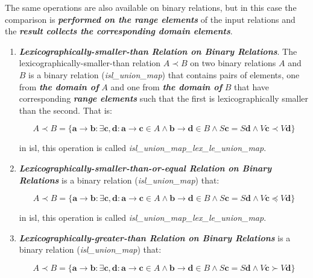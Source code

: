 The same operations are also available on binary relations, but in this case the comparison is \textbf{\textit{performed on the range elements}} of the input relations and the \textbf{\textit{result collects the corresponding domain elements}}.

\begin{enumerate}
  \item \textcolor{vr}{\textbf{\emph{Lexicographically-smaller-than Relation on Binary Relations}}}. The lexicographically-smaller-than relation $A \prec B$ on two binary relations $A$ and $B$ is a binary relation (\textcolor{pg}{\emph{isl\_union\_map}}) that contains pairs of elements, one from \textbf{\textit{the domain of}} $A$ and one from \textbf{\textit{the domain of}} $B$ that have corresponding \textbf{\textit{range elements}} such that the first is lexicographically smaller than the second. That is:

  $$A \prec B = \{
  \mathbf{a} \rightarrow \mathbf{b}: \exists \mathbf{c},\mathbf{d}:
  \mathbf{a} \rightarrow \mathbf{c} \in A \wedge \mathbf{b} \rightarrow \mathbf{d} \in B
  \wedge \mathit{S}\mathbf{c} = \mathit{S}\mathbf{d}
  \wedge \mathit{V}\mathbf{c} \prec \mathit{V}\mathbf{d}
  \}$$

  in isl, this operation is called \textcolor{pg}{\emph{isl\_union\_map\_lex\_le\_union\_map}}.

  \item \textcolor{vr}{\textbf{\emph{Lexicographically-smaller-than-or-equal Relation on Binary Relations}}} is a binary relation (\textcolor{pg}{\emph{isl\_union\_map}}) that:

  $$A \prec B = \{
  \mathbf{a} \rightarrow \mathbf{b}: \exists \mathbf{c},\mathbf{d}:
  \mathbf{a} \rightarrow \mathbf{c} \in A \wedge \mathbf{b} \rightarrow \mathbf{d} \in B
  \wedge \mathit{S}\mathbf{c} = \mathit{S}\mathbf{d}
  \wedge \mathit{V}\mathbf{c} \preccurlyeq \mathit{V}\mathbf{d}
  \}$$

  in isl, this operation is called \textcolor{pg}{\emph{isl\_union\_map\_lex\_le\_union\_map}}.

  \item \textcolor{vr}{\textbf{\emph{Lexicographically-greater-than Relation on Binary Relations}}} is a binary relation (\textcolor{pg}{\emph{isl\_union\_map}}) that:

  $$A \prec B = \{
  \mathbf{a} \rightarrow \mathbf{b}: \exists \mathbf{c},\mathbf{d}:
  \mathbf{a} \rightarrow \mathbf{c} \in A \wedge \mathbf{b} \rightarrow \mathbf{d} \in B
  \wedge \mathit{S}\mathbf{c} = \mathit{S}\mathbf{d}
  \wedge \mathit{V}\mathbf{c} \succ \mathit{V}\mathbf{d}
  \}$$


\end{enumerate}
